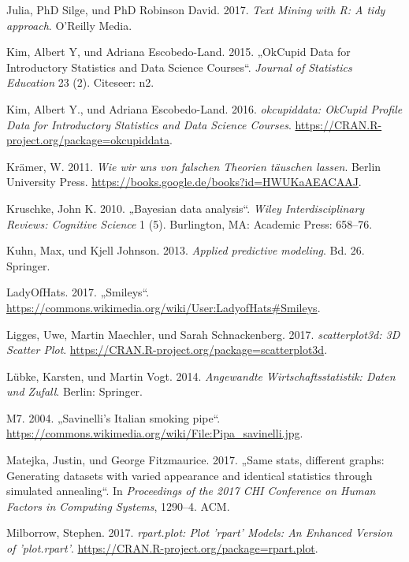 \documentclass[12pt,ngerman,]{book}
\begin{document}
\hypertarget{ref-tidytextminig}{}
Julia, PhD Silge, und PhD Robinson David. 2017. \emph{Text Mining with
R: A tidy approach}. O'Reilly Media.

\hypertarget{ref-kim2015okcupid}{}
Kim, Albert Y, und Adriana Escobedo-Land. 2015. „OkCupid Data for
Introductory Statistics and Data Science Courses``. \emph{Journal of
Statistics Education} 23 (2). Citeseer: n2.

\hypertarget{ref-R-okcupiddata}{}
Kim, Albert Y., und Adriana Escobedo-Land. 2016. \emph{okcupiddata:
OkCupid Profile Data for Introductory Statistics and Data Science
Courses}. \url{https://CRAN.R-project.org/package=okcupiddata}.

\hypertarget{ref-kraemer2011wir}{}
Krämer, W. 2011. \emph{Wie wir uns von falschen Theorien täuschen
lassen}. Berlin University Press.
\url{https://books.google.de/books?id=HWUKaAEACAAJ}.

\hypertarget{ref-kruschke2010bayesian}{}
Kruschke, John K. 2010. „Bayesian data analysis``. \emph{Wiley
Interdisciplinary Reviews: Cognitive Science} 1 (5). Burlington, MA:
Academic Press: 658--76.

\hypertarget{ref-kuhn2013applied}{}
Kuhn, Max, und Kjell Johnson. 2013. \emph{Applied predictive modeling}.
Bd. 26. Springer.

\hypertarget{ref-ladyofhats_smileys_2017}{}
LadyOfHats. 2017. „Smileys``.
\url{https://commons.wikimedia.org/wiki/User:LadyofHats\#Smileys}.

\hypertarget{ref-R-scatterplot3d}{}
Ligges, Uwe, Martin Maechler, und Sarah Schnackenberg. 2017.
\emph{scatterplot3d: 3D Scatter Plot}.
\url{https://CRAN.R-project.org/package=scatterplot3d}.

\hypertarget{ref-lubke2014angewandte}{}
Lübke, Karsten, und Martin Vogt. 2014. \emph{Angewandte
Wirtschaftsstatistik: Daten und Zufall}. Berlin: Springer.

\hypertarget{ref-m7_savinellis_2004}{}
M7. 2004. „Savinelli's Italian smoking pipe``.
\url{https://commons.wikimedia.org/wiki/File:Pipa_savinelli.jpg}.

\hypertarget{ref-matejka2017same}{}
Matejka, Justin, und George Fitzmaurice. 2017. „Same stats, different
graphs: Generating datasets with varied appearance and identical
statistics through simulated annealing``. In \emph{Proceedings of the
2017 CHI Conference on Human Factors in Computing Systems}, 1290--4.
ACM.

\hypertarget{ref-R-rpart.plot}{}
Milborrow, Stephen. 2017. \emph{rpart.plot: Plot 'rpart' Models: An
Enhanced Version of 'plot.rpart'}.
\url{https://CRAN.R-project.org/package=rpart.plot}.
\end{document}
